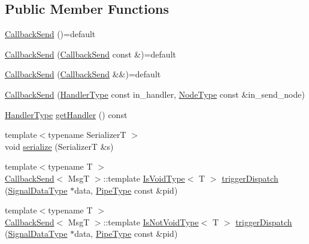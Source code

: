 \subsection*{Public Member Functions}
\begin{DoxyCompactItemize}
\item 
\hyperlink{structvt_1_1pipe_1_1callback_1_1_callback_send_aad073e948c05410190ba09425772d3a3}{Callback\+Send} ()=default
\item 
\hyperlink{structvt_1_1pipe_1_1callback_1_1_callback_send_ae45cdb5d7d006708d6bbae455c4a22d1}{Callback\+Send} (\hyperlink{structvt_1_1pipe_1_1callback_1_1_callback_send}{Callback\+Send} const \&)=default
\item 
\hyperlink{structvt_1_1pipe_1_1callback_1_1_callback_send_accc854042b241e9e5149f4c48da57ed1}{Callback\+Send} (\hyperlink{structvt_1_1pipe_1_1callback_1_1_callback_send}{Callback\+Send} \&\&)=default
\item 
\hyperlink{structvt_1_1pipe_1_1callback_1_1_callback_send_a97b27637052dc74f0f500f250ddbb9b7}{Callback\+Send} (\hyperlink{namespacevt_af64846b57dfcaf104da3ef6967917573}{Handler\+Type} const in\+\_\+handler, \hyperlink{namespacevt_a866da9d0efc19c0a1ce79e9e492f47e2}{Node\+Type} const \&in\+\_\+send\+\_\+node)
\item 
\hyperlink{namespacevt_af64846b57dfcaf104da3ef6967917573}{Handler\+Type} \hyperlink{structvt_1_1pipe_1_1callback_1_1_callback_send_ad02a9711c4603807d6fe40a5dd3b4859}{get\+Handler} () const
\item 
{\footnotesize template$<$typename SerializerT $>$ }\\void \hyperlink{structvt_1_1pipe_1_1callback_1_1_callback_send_ae3abb8abfeee32b445a4ff13fd591745}{serialize} (SerializerT \&s)
\item 
{\footnotesize template$<$typename T $>$ }\\\hyperlink{structvt_1_1pipe_1_1callback_1_1_callback_send}{Callback\+Send}$<$ MsgT $>$\+::template \hyperlink{structvt_1_1pipe_1_1callback_1_1_callback_send_afbb9475a84ba4a7b3db3c7493672dbe6}{Is\+Void\+Type}$<$ T $>$ \hyperlink{structvt_1_1pipe_1_1callback_1_1_callback_send_aa9d0685e0564118a4198640ae8ef640c}{trigger\+Dispatch} (\hyperlink{structvt_1_1pipe_1_1callback_1_1_callback_send_a5b21820f25b28f980921b1fe24d8a2dc}{Signal\+Data\+Type} $\ast$data, \hyperlink{namespacevt_ac9852acda74d1896f48f406cd72c7bd3}{Pipe\+Type} const \&pid)
\item 
{\footnotesize template$<$typename T $>$ }\\\hyperlink{structvt_1_1pipe_1_1callback_1_1_callback_send}{Callback\+Send}$<$ MsgT $>$\+::template \hyperlink{structvt_1_1pipe_1_1callback_1_1_callback_send_adb85e64e67e00aa71a9c173565dfb7dc}{Is\+Not\+Void\+Type}$<$ T $>$ \hyperlink{structvt_1_1pipe_1_1callback_1_1_callback_send_a26915bf9dac921974b7d4a7cb156083a}{trigger\+Dispatch} (\hyperlink{structvt_1_1pipe_1_1callback_1_1_callback_send_a5b21820f25b28f980921b1fe24d8a2dc}{Signal\+Data\+Type} $\ast$data, \hyperlink{namespacevt_ac9852acda74d1896f48f406cd72c7bd3}{Pipe\+Type} const \&pid)
\end{DoxyCompactItemize}
